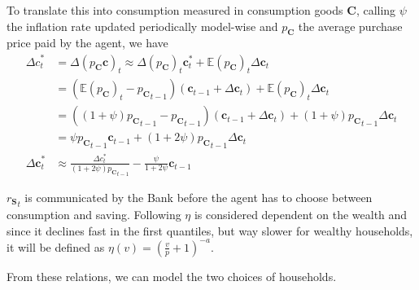 \documentclass[a4paper, headings=standardclasses]{scrartcl}
\begin{document}
To translate this into consumption measured in consumption goods $\mathbf{C}$, calling $\psi$ the inflation rate updated periodically model-wise and $p_\mathbf{C}$ the average purchase price paid by the agent, we have
\begin{align*}
	{\Delta c}^*_t          & = \Delta (p_\mathbf{C} \mathbf{c})_t \approx \Delta(p_\mathbf{C})_t \mathbf{c}^*_t + \mathbb{E}(p_\mathbf{C})_t {\Delta \mathbf{c}}_t                   \\
	                        & = (\mathbb{E}(p_\mathbf{C})_t - {p_\mathbf{C}}_{t-1}) (\mathbf{c}_{t-1} + {\Delta \mathbf{c}}_t) + \mathbb{E}(p_\mathbf{C})_t {\Delta \mathbf{c}}_t     \\
	                        & = ((1+\psi){p_\mathbf{C}}_{t-1} - {p_\mathbf{C}}_{t-1}) (\mathbf{c}_{t-1} + {\Delta \mathbf{c}}_t) + (1+\psi){p_\mathbf{C}}_{t-1} {\Delta \mathbf{c}}_t \\
	                        & = \psi {p_\mathbf{C}}_{t-1} \mathbf{c}_{t-1} + (1+2\psi){p_\mathbf{C}}_{t-1} {\Delta \mathbf{c}}_t                                                      \\
	{\Delta \mathbf{c}}^*_t & \approx \frac{\Delta c^*_t}{(1+2\psi){p_\mathbf{C}}_{t-1}} - \frac{\psi}{1+2\psi}{\mathbf{c}_{t-1}}
\end{align*}

${r_\mathbf{S}}_t$ is communicated by the Bank before the agent has to choose between consumption and saving. Following \textcite{fisher2020} $\eta$ is considered dependent on the wealth and since it declines fast in the first quantiles, but way slower for wealthy households, it will be defined as $\eta(v) = (\frac{v}{p} + 1)^{-a}$.

From these relations, we can model the two choices of households.
\end{document}
